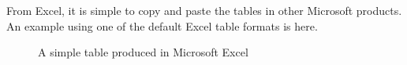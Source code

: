 \documentclass[a4paper,11pt]{article}\usepackage[]{graphicx}\usepackage[]{color}
\begin{document}
From Excel, it is simple to copy and paste the tables in other Microsoft products. An example using one of the default Excel table formats is here.

\begin{figure}[ht!]
\centering
\caption{A simple table produced in Microsoft Excel}
\label{overflow}
\end{figure}

\clearpage

% 
% 
% 
% 

\end{document}
